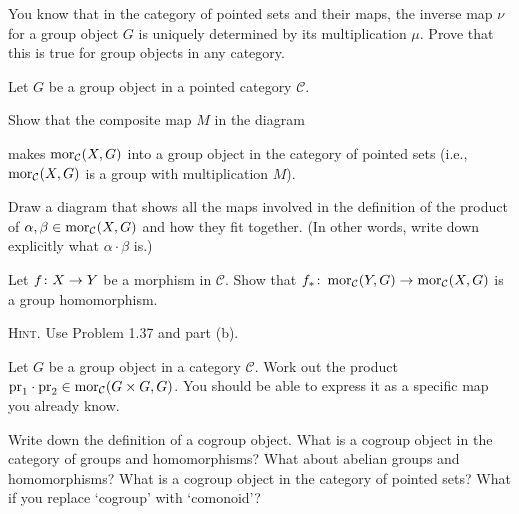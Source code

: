 \bs
\ben[label=(\alph*)]
\item
\item
\item
\een
\es

\bx
You know that in the category of pointed sets and their maps, the inverse map $\nu$ for a group object $G$ is uniquely determined by its multiplication $\mu$. Prove that this is true for group objects in any category.
\ex

\bs
\es

\bp
Let $G$ be a group object in a pointed category $\mathcal{C}$.
\ben[label=(\alph*)]
\item Show that the composite map $M$ in the diagram
\bse
{}
\ese
makes $\operatorname{mor}_{\mathcal{C}}(X,G)$ into a group object in the category of pointed sets (i.e., $\operatorname{mor}_{\mathcal{C}}(X,G)$ is a group with multiplication $M$).
\item Draw a diagram that shows all the maps involved in the definition of the product of $\alpha,\beta\in\operatorname{mor}_{\mathcal{C}}(X,G)$ and how they fit together. (In other words, write down explicitly what $\alpha\cdot\beta$ is.)
\item Let $f \colon X \to Y$ be a morphism in $\mathcal{C}$. Show that $f_*\colon \operatorname{mor}_{\mathcal{C}}(Y,G) \to \operatorname{mor}_{\mathcal{C}}(X,G)$ is a group homomorphism.

{\scshape Hint}. Use Problem 1.37 and part (b).
\een
\ep

\bs
\ben[label=(\alph*)]
\item
\item
\item
\een
\es

\addtocounter{exercise}{1}
\bx
Let $G$ be a group object in a category $\mathcal{C}$. Work out the product $\mathrm{pr}_1\cdot \mathrm{pr}_2\in \operatorname{mor}_{\mathcal{C}}(G \times G,G)$. You should be able to express it as a specific map you already know.
\ex

\bs
\es

\bp
Write down the definition of a cogroup object. What is a cogroup object in the category of groups and homomorphisms? What about abelian groups and homomorphisms? What is a cogroup object in the category of pointed sets? What if you replace `cogroup' with `comonoid'?
\ep


